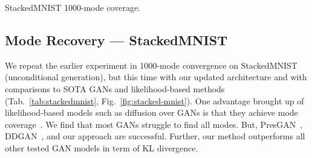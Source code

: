 \begin{table}
\vspace{-1.25cm}
\centering
\caption{StackedMNIST 1000-mode coverage.}
\vspace{-0.4cm}
\label{tab:stackedmnist}
\end{table}%

\subsection{Mode Recovery --- StackedMNIST\texorpdfstring{~\cite{metz2016unrolled}}{}} 
\vspace{-0.1cm}
We repeat the earlier experiment in 1000-mode convergence on StackedMNIST (unconditional generation), but this time with our updated architecture and with comparisons to SOTA GANs and likelihood-based methods (Tab.~\ref{tab:stackedmnist}, Fig.~\ref{fig:stacked-mnist}). 
One advantage brought up of likelihood-based models such as diffusion over GANs is that they achieve mode coverage~\cite{adm}. We find that most GANs struggle to find all modes. But, PresGAN~\cite{presgan}, DDGAN~\cite{ddgan}, and our approach are successful. Further, our method outperforms all other tested GAN models in term of KL divergence.

